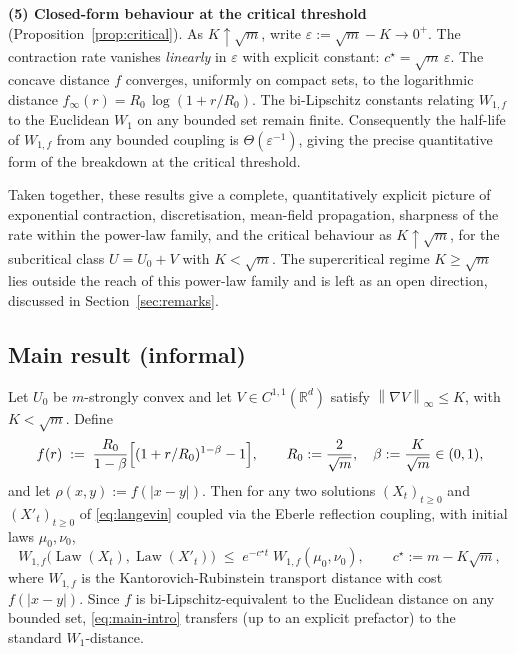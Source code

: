 \documentclass[11pt]{article}
\theoremstyle{definition}
\DeclareMathOperator{\Law}{Law}
\newcommand{\R}{\mathbb{R}}
\newcommand{\norm}[1]{\left\lVert #1 \right\rVert}
\newcommand{\abs}[1]{\left\lvert #1 \right\rvert}
\begin{document}
\textbf{(5) Closed-form behaviour at the critical threshold} (Proposition~\ref{prop:critical}). As $K \uparrow \sqrt m$, write $\varepsilon := \sqrt m - K \to 0^+$. The contraction rate vanishes \emph{linearly} in $\varepsilon$ with explicit constant: $c^\star = \sqrt m\,\varepsilon$. The concave distance $f$ converges, uniformly on compact sets, to the logarithmic distance $f_\infty(r) = R_0\,\log(1 + r/R_0)$. The bi-Lipschitz constants relating $W_{1,f}$ to the Euclidean $W_1$ on any bounded set remain finite. Consequently the half-life of $W_{1,f}$ from any bounded coupling is $\Theta(\varepsilon^{-1})$, giving the precise quantitative form of the breakdown at the critical threshold.

\smallskip

Taken together, these results give a complete, quantitatively explicit picture of exponential contraction, discretisation, mean-field propagation, sharpness of the rate within the power-law family, and the critical behaviour as $K \uparrow \sqrt m$, for the subcritical class $U = U_0 + V$ with $K < \sqrt m$. The supercritical regime $K \ge \sqrt m$ lies outside the reach of this power-law family and is left as an open direction, discussed in Section~\ref{sec:remarks}.

\subsection{Main result (informal)}

Let $U_0$ be $m$-strongly convex and let $V \in C^{1,1}(\R^d)$ satisfy $\norm{\nabla V}_\infty \le K$, with $K < \sqrt{m}$. Define
\begin{equation}\label{eq:fdef-intro}
f(r) \;:=\; \frac{R_0}{1-\beta}\Bigl[(1 + r/R_0)^{1-\beta} - 1\Bigr], \qquad R_0 := \frac{2}{\sqrt m},\quad \beta := \frac{K}{\sqrt m} \in (0,1),
\end{equation}
and let $\rho(x,y) := f(\abs{x-y})$. Then for any two solutions $(X_t)_{t\ge0}$ and $(X'_t)_{t\ge0}$ of \eqref{eq:langevin} coupled via the Eberle reflection coupling, with initial laws $\mu_0,\nu_0$,
\begin{equation}\label{eq:main-intro}
W_{1,f}\bigl(\Law(X_t),\Law(X'_t)\bigr) \;\le\; e^{-c^\star t}\; W_{1,f}(\mu_0,\nu_0), \qquad c^\star := m - K\sqrt m,
\end{equation}
where $W_{1,f}$ is the Kantorovich-Rubinstein transport distance with cost $f(\abs{x-y})$. Since $f$ is bi-Lipschitz-equivalent to the Euclidean distance on any bounded set, \eqref{eq:main-intro} transfers (up to an explicit prefactor) to the standard $W_1$-distance.
\end{document}
